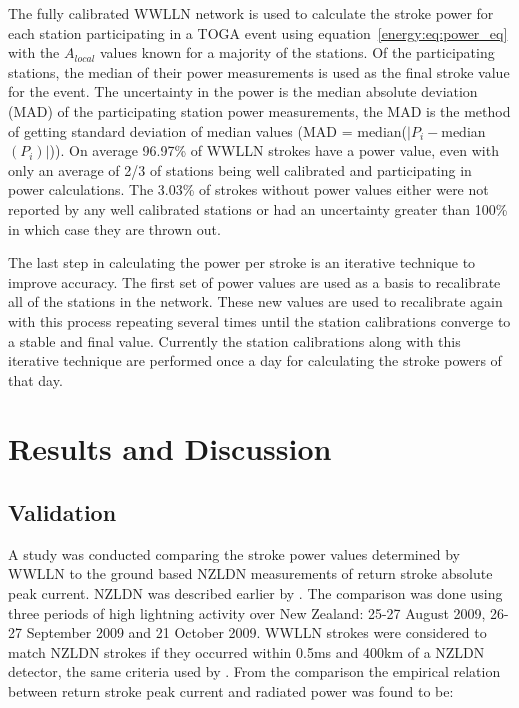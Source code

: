 The fully calibrated WWLLN network is used to calculate the stroke power for each station participating in a TOGA event using equation~\ref{energy:eq:power_eq} with the $A_{local}$ values known for a majority of the stations.
Of the participating stations, the median of their power measurements is used as the final stroke value for the event.
The uncertainty in the power is the median absolute deviation (MAD) of the participating station power measurements, the MAD is the method of getting standard deviation of median values (MAD = median($|P_i - $median$(P_i)|$)).
On average 96.97\% of WWLLN strokes have a power value, even with only an average of 2/3 of stations being well calibrated and participating in power calculations.
The 3.03\% of strokes without power values either were not reported by any well calibrated stations or had an uncertainty greater than 100\% in which case they are thrown out.

The last step in calculating the power per stroke is an iterative technique to improve accuracy.
The first set of power values are used as a basis to recalibrate all of the stations in the network.
These new values are used to recalibrate again with this process repeating several times until the station calibrations converge to a stable and final value.
Currently the station calibrations along with this iterative technique are performed once a day for calculating the stroke powers of that day.

\section{Results and Discussion}

\subsection{Validation}

A study was conducted comparing the stroke power values determined by WWLLN to the ground based NZLDN measurements of return stroke absolute peak current. NZLDN was described earlier by \citet{Rodger2006}.
The comparison was done using three periods of high lightning activity over New Zealand: 25-27 August 2009, 26-27 September 2009 and 21 October 2009.
WWLLN strokes were considered to match NZLDN strokes if they occurred within 0.5ms and 400km of a NZLDN detector, the same criteria used by \citet{Rodger2006}.
From the comparison the empirical relation between return stroke peak current and radiated power was found to be: 

